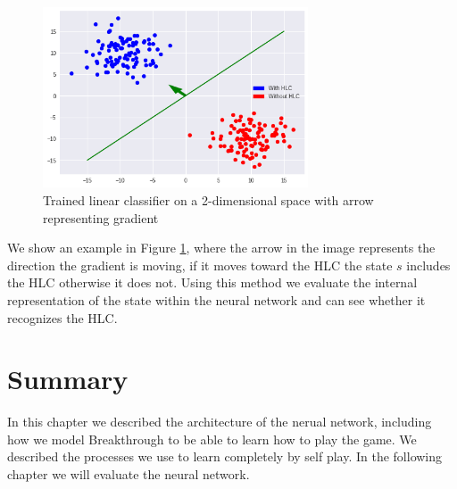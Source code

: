 \begin{figure}[]
    \centering
    \includegraphics[width=0.7\textwidth]{graphics/linear_separation_with_direction}
    \caption{Trained linear classifier on a 2-dimensional space with arrow representing gradient}
    \label{fig:scattersplitarrow}
\end{figure}

We show an example in Figure \ref{fig:scattersplitarrow}, where the arrow in the image represents the direction the gradient is moving, if it moves toward the HLC the state $s$ includes the HLC otherwise it does not. Using this method we evaluate the internal representation of the state within the neural network and can see whether it recognizes the HLC.

\section{Summary}

In this chapter we described the architecture of the nerual network, including how we model Breakthrough to be able to learn how to play the game. We described the processes we use to learn completely by self play. In the following chapter we will evaluate the neural network.
